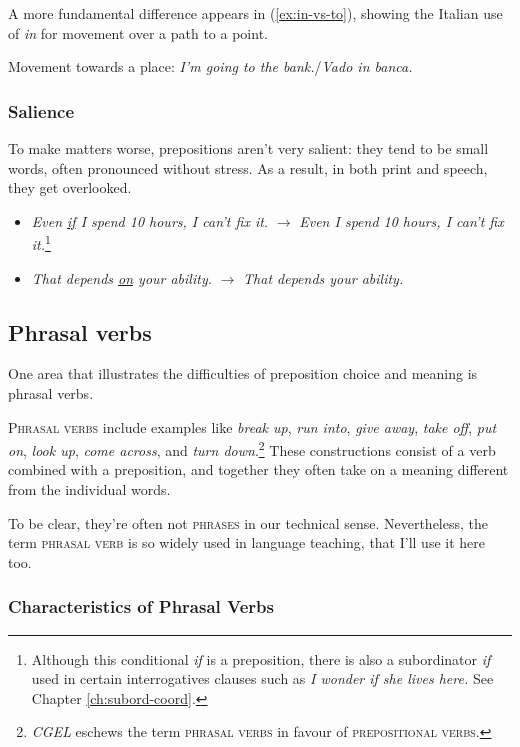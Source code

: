 A more fundamental difference appears in (\ref{ex:in-vs-to}), showing the Italian use of \textit{in} for movement over a path to a point.

\ea Movement towards a place: \textit{I'm going to the bank.}/\textit{Vado in banca.}\label{ex:in-vs-to}
\z

\subsubsection*{Salience}
To make matters worse, prepositions aren't very salient: they tend to be small words, often pronounced without stress. As a result, in both print and speech, they get overlooked.

\begin{itemize}
    \item   \textit{Even \uline{if} I spend 10 hours, I can't fix it.} $\rightarrow$ \textit{Even I spend 10 hours, I can't fix it.}\footnote{Although this conditional  \textit{if} is a preposition, there is also a subordinator \textit{if} used in certain interrogatives clauses such as \textit{I wonder if she lives here.} See Chapter \ref{ch:subord-coord}.}
    \item \textit{That depends \uline{on} your ability.} $\rightarrow$ \textit{That depends your ability.}
\end{itemize}

\subsection{Phrasal verbs}

One area that illustrates the difficulties of preposition choice and meaning is phrasal verbs.

\textsc{Phrasal verbs} include examples like \textit{break up}, \textit{run into}, \textit{give away}, \textit{take off}, \textit{put on}, \textit{look up}, \textit{come across}, and \textit{turn down}.\footnote{\textit{CGEL} \citep{Huddleston2002} eschews the term \textsc{phrasal verbs} in favour of \textsc{prepositional verbs}.} These constructions consist of a verb combined with a preposition, and together they often take on a meaning different from the individual words.

To be clear, they're often not \textsc{phrases} in our technical sense. Nevertheless, the term \textsc{phrasal verb} is so widely used in language teaching, that I'll use it here too. 

\subsubsection*{Characteristics of Phrasal Verbs}

